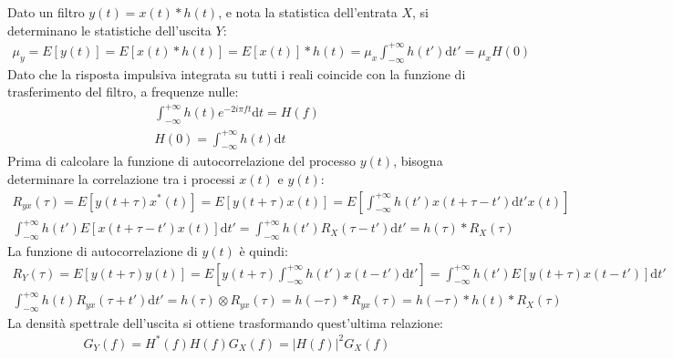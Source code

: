 \documentclass{article}
\newcommand{\df}{\mathrm{d}}
\numberwithin{equation}{subsection}
\begin{document}
Dato un filtro $y(t)=x(t)*h(t)$, e nota la statistica dell'entrata $X$, si determinano le statistiche dell'uscita $Y$:
\begin{gather*}
    \mu_y=E[y(t)]=E[x(t)*h(t)]=E[x(t)]*h(t)=\displaystyle\mu_x\int_{-\infty}^{+\infty}h(t')\df t'=\mu_xH(0)
\end{gather*}
Dato che la risposta impulsiva integrata su tutti i reali coincide con la funzione di trasferimento del filtro, a frequenze nulle:
\begin{gather*}
    \displaystyle\int_{-\infty}^{+\infty}h(t)e^{-2i\pi ft}\df t=H(f)\\
    H(0)=\displaystyle\int_{-\infty}^{+\infty}h(t)\df t
\end{gather*}
Prima di calcolare la funzione di autocorrelazione del processo $y(t)$, bisogna determinare la correlazione tra i processi $x(t)$ e $y(t)$:
\begin{gather*}
    R_{yx}(\tau)=E[y(t+\tau)x^*(t)]=E[y(t+\tau)x(t)]=E\left[\displaystyle\int_{-\infty}^{+\infty}h(t')x(t+\tau-t')\df t'x(t)\right]\\
    \displaystyle\int_{-\infty}^{+\infty}h(t')E[x(t+\tau-t')x(t)]\df t'=\displaystyle\int_{-\infty}^{+\infty}h(t')R_X(\tau-t')\df t'=h(\tau)*R_X(\tau)
\end{gather*}
La funzione di autocorrelazione di $y(t)$ è quindi:
\begin{gather*}
    R_Y(\tau)=E[y(t+\tau)y(t)]=E\left[y(t+\tau)\displaystyle\int_{-\infty}^{+\infty}h(t')x(t-t')\df t'\right]=\int_{-\infty}^{+\infty}h(t')E[y(t+\tau)x(t-t')]\df t'\\
    \displaystyle\int_{-\infty}^{+\infty}h(t)R_{yx}(\tau+t')\df t'=h(\tau)\otimes R_{yx}(\tau)=h(-\tau)*R_{yx}(\tau)=h(-\tau)*h(t)*R_X(\tau)
\end{gather*}
La densità spettrale dell'uscita si ottiene trasformando quest'ultima relazione:
\begin{gather*}
    G_Y(f)=H^*(f)H(f)G_X(f)=|H(f)|^2G_X(f)
\end{gather*}
\end{document}
